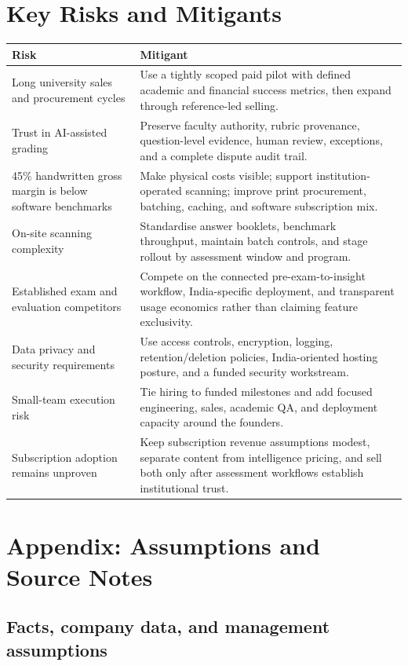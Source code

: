 \documentclass[11pt,a4paper]{article}
\begin{document}
\section{Key Risks and Mitigants}

\begin{tabularx}{\textwidth}{L{0.30\textwidth}Y}
\toprule
\textbf{Risk} & \textbf{Mitigant} \\
\midrule
Long university sales and procurement cycles & Use a tightly scoped paid pilot with defined academic and financial success metrics, then expand through reference-led selling. \\
Trust in AI-assisted grading & Preserve faculty authority, rubric provenance, question-level evidence, human review, exceptions, and a complete dispute audit trail. \\
45\% handwritten gross margin is below software benchmarks & Make physical costs visible; support institution-operated scanning; improve print procurement, batching, caching, and software subscription mix. \\
On-site scanning complexity & Standardise answer booklets, benchmark throughput, maintain batch controls, and stage rollout by assessment window and program. \\
Established exam and evaluation competitors & Compete on the connected pre-exam-to-insight workflow, India-specific deployment, and transparent usage economics rather than claiming feature exclusivity. \\
Data privacy and security requirements & Use access controls, encryption, logging, retention/deletion policies, India-oriented hosting posture, and a funded security workstream. \\
Small-team execution risk & Tie hiring to funded milestones and add focused engineering, sales, academic QA, and deployment capacity around the founders. \\
Subscription adoption remains unproven & Keep subscription revenue assumptions modest, separate content from intelligence pricing, and sell both only after assessment workflows establish institutional trust. \\
\bottomrule
\end{tabularx}

\section{Appendix: Assumptions and Source Notes}

\subsection{Facts, company data, and management assumptions}
\end{document}
